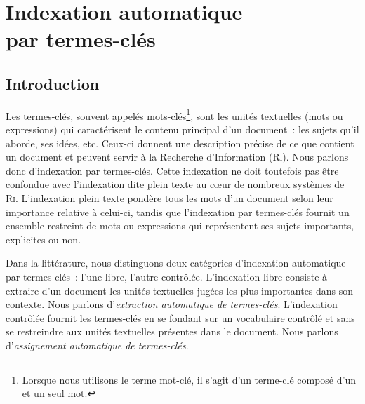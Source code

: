 \chapter[Indexation automatique par termes-clés]{Indexation automatique\\par termes-clés}
\label{chap:main-state_of_the_art}

  \section{Introduction}
  \label{sec:main-state_of_the_art-introduction}
    Les termes-clés,
    souvent appelés mots-clés\footnote{Lorsque nous utilisons le terme
    \og{}mot-clé\fg{}, il s'agit d'un terme-clé composé d'un et un seul mot.},
    sont les unités textuelles (mots ou expressions) qui caractérisent le
    contenu principal d'un document~: les sujets qu'il aborde, ses idées, etc.
    Ceux-ci donnent une description précise de ce que contient un document et
    peuvent servir à la Recherche d'Information (\textsc{Ri}). Nous parlons donc
    d'indexation par termes-clés. Cette
    indexation ne doit toutefois pas être confondue avec l'indexation dite
    \og{}plein texte\fg{} au c\oe{}ur de nombreux systèmes de \textsc{Ri}.
    L'indexation plein texte pondère tous les mots d'un document selon leur
    importance relative à celui-ci, tandis que l'indexation par termes-clés
    fournit un ensemble restreint de mots ou expressions qui représentent ses
    sujets importants, explicites ou non.

    Dans la littérature, nous distinguons deux catégories d'indexation
    automatique par termes-clés~: l'une libre, l'autre contrôlée. L'indexation
    libre consiste à extraire d'un document les unités textuelles
    jugées les plus importantes dans son contexte. Nous parlons
    d'\emph{extraction automatique de termes-clés}. L'indexation contrôlée fournit les termes-clés en se fondant sur un vocabulaire
    contrôlé et sans se restreindre aux unités textuelles présentes dans le
    document. Nous parlons d'\emph{assignement automatique de
    termes-clés}.

